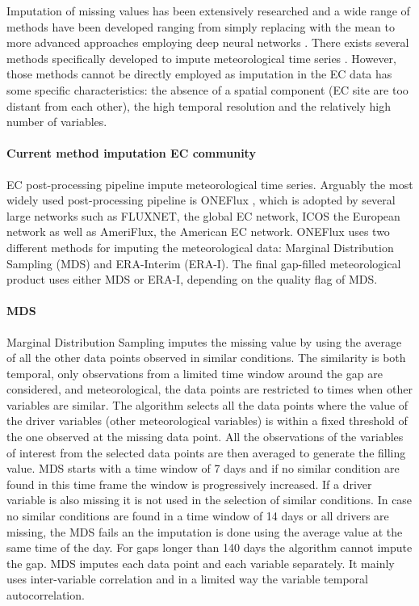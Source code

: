 \documentclass{article}
\begin{document}
Imputation of missing values has been extensively researched and a wide range of methods have been developed ranging from simply replacing with the mean to more advanced approaches employing deep neural networks \cite{moritz_r_2017, fang_time_2020-1, buuren_mice_2011, du_saits_2022-1, zhang_dual-head_2021-2, cao_brits_nodate}. There exists several methods specifically developed to impute meteorological time series \cite{costa_gap_2021, jing_multi-imputation_2022}. However, those methods cannot be directly employed as imputation in the EC data has some specific characteristics: the absence of a spatial component (EC site are too distant from each other), the high temporal resolution and the relatively high number of variables. 

\paragraph{Current method imputation EC community} EC post-processing pipeline impute meteorological time series. Arguably the most widely used post-processing pipeline is ONEFlux \cite{pastorello_fluxnet2015_2020}, which is adopted by several large networks such as FLUXNET, the global EC network, ICOS the European network as well as AmeriFlux, the American EC network.
ONEFlux uses two different methods for imputing the meteorological data: Marginal Distribution Sampling (MDS) and ERA-Interim (ERA-I). The final gap-filled meteorological product uses either MDS or ERA-I, depending on the quality flag of MDS.
\paragraph{MDS} Marginal Distribution Sampling \cite{reichstein_separation_2005-3} imputes the missing value by using the average of all the other data points observed in similar conditions. The similarity is both temporal, only observations from a limited time window around the gap are considered, and meteorological, the data points are restricted to times when other variables are similar. 
The algorithm selects all the data points where the value of the driver variables (other meteorological variables) is within a fixed threshold of the one observed at the missing data point. All the observations of the variables of interest from the selected data points are then averaged to generate the filling value. MDS starts with a time window of 7 days and if no similar condition are found in this time frame the window is progressively increased. If a driver variable is also missing it is not used in the selection of similar conditions. 
In case no similar conditions are found in a time window of 14 days or all drivers are missing, the MDS fails an the imputation is done using the average value at the same time of the day. For gaps longer than 140 days the algorithm cannot impute the gap.
MDS imputes each data point and each variable separately. It mainly uses inter-variable correlation and in a limited way the variable temporal autocorrelation. 
\end{document}
